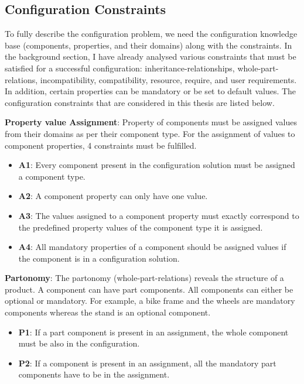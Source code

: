 \subsection{Configuration Constraints}
To fully describe the configuration problem, we need the configuration knowledge base (components, properties, and their domains) along with the constraints.
In the background section, I have already analysed various constraints that must be satisfied for a successful configuration: inheritance-relationships, whole-part-relations, incompatibility, compatibility, resource, require, and user requirements. 
In addition, certain properties can be mandatory or be set to default values. 
The configuration constraints that are considered in this thesis are listed below. \newline

\noindent \textbf{Property value Assignment}: Property of components must be assigned values from their domains as per their component type. For the assignment of values to component properties, 4 constraints must be fulfilled. 
\begin{itemize}
 \item \textbf{A1}: Every component present in the configuration solution must be assigned a component type.
 \item \textbf{A2}: A component property can only have one value. 
 \item \textbf{A3}: The values assigned to a component property must exactly correspond to the predefined property values of the component type it is assigned.
 \item \textbf{A4}: All mandatory properties of a component should be assigned values if the component is in a configuration solution.
\end{itemize}

\noindent \textbf{Partonomy}: The partonomy (whole-part-relations) reveals the structure of a product. A component can have part components. All components can either be optional or mandatory. For example, a bike frame and the wheels are mandatory components whereas the stand is an optional component. 
\begin{itemize}
\item \textbf{P1}: If a part component is present in an assignment, the whole component must be also in the configuration. 
\item \textbf{P2}: If a component is present in an assignment, all the mandatory part components have to be in the assignment. 
\end{itemize}

